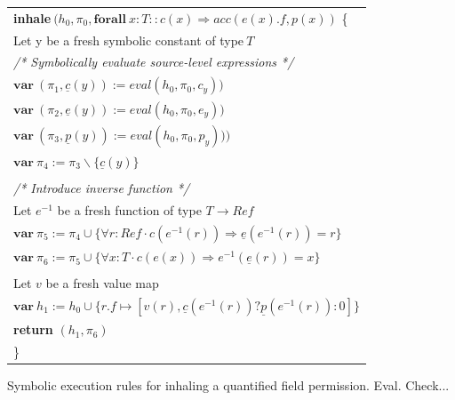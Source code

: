 \documentclass[12pt]{article}
\begin{document}
\newcommand*{\ident}{\hspace*{0.5cm}}%
\begin{figure}[hb]
  \centering
\begin{tabularx}{.9\textwidth}{| X |}
\hline
\textbf{inhale}\(\ (h_0, \pi_0,  \mathbf{forall\ } x:T :: c(x) \Rightarrow acc(e(x).f, p(x))\) \{\\
\ident Let y be a fresh symbolic constant of type\( \ T\) \\
\ident \textit{/* Symbolically evaluate source-level expressions */} \\
\ident \( \mathbf{var\ } (\pi_1, \underline{c}(y)) := eval(h_0, \pi_0, c_y)) \)\\
\ident \( \mathbf{var\ } (\pi_2,\underline{e}(y)) := eval(h_0, \pi_0, e_y)) \)\\
\ident \( \mathbf{var\ } (\pi_3,\underline{p}(y)) := eval(h_0, \pi_0, p_y))) \)\\
\ident \( \mathbf{var\ } \pi_4 := \pi_3 \backslash \{\underline{c}(y)\} \)\\
\\
\ident \textit{/* Introduce inverse function */}\\
\ident Let  \(e^{-1}\)  be a fresh function of type  \(T \rightarrow Ref\) \\
\ident \(  \mathbf{var\ } \pi_5 :=  \pi_4 \cup \{\forall r: Ref \cdot c(e^{-1}(r))  \Rightarrow \underline{e}(e^{-1}(r)) = r \} \) \\
\ident \(  \mathbf{var\ } \pi_6 :=  \pi_5 \cup \{\forall x:T \cdot c(e(x))  \Rightarrow e^{-1}(\underline{e}(r)) = x \}  \) \\
\\
\ident Let  \(v\)  be a fresh value map \\
\ident \( \mathbf{var\ } h_1 :=  h_0 \cup \{r.f \mapsto [v(r), \underline{c}(e^{-1}(r)) ? \underline{p}(e^{-1}(r)) : 0] \}  \) \\
\ident \textbf{return} \( (h_1, \pi_6) \) \\
\}\\ \hline
\end{tabularx}
\caption[Inhaling a Quantified Field Permission]
   {Symbolic execution rules for inhaling a quantified field permission. Eval. Check...}
\end{figure}
\end{document}

